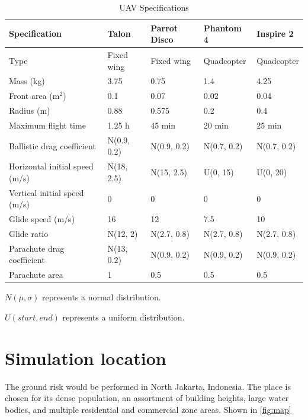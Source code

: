 \documentclass[12pt]{report}
\begin{document}
        \begin{table}[H]
            \centering
            \caption{UAV Specifications}  %
            \begin{tabular}{| l | l | l | l | l |}
                \hline
                \textbf{Specification} & \textbf{Talon} & \textbf{Parrot Disco} & \textbf{Phantom 4} & \textbf{Inspire 2} \\
                \hline
                Type & Fixed wing & Fixed wing & Quadcopter & Quadcopter \\
                Mass (kg) & 3.75 & 0.75 & 1.4 & 4.25 \\
                Front area (m$^2$) & 0.1 & 0.07 & 0.02 & 0.04 \\
                Radius (m) & 0.88 & 0.575 & 0.2 & 0.4 \\
                Maximum flight time & 1.25 h & 45 min & 20 min & 25 min \\
                Ballistic drag coefficient & N(0.9, 0.2) & N(0.9, 0.2) & N(0.7, 0.2) & N(0.7, 0.2) \\
                Horizontal initial speed (m/s) & N(18, 2.5) & N(15, 2.5) & U(0, 15) & U(0, 20) \\
                Vertical initial speed (m/s) & 0 & 0 & 0 & 0 \\
                Glide speed (m/s) & 16 & 12 & 7.5 & 10 \\
                Glide ratio & N(12, 2) & N(2.7, 0.8) & N(2.7, 0.8) & N(2.7, 0.8) \\
                Parachute drag coefficient & N(13, 0.2) & N(0.9, 0.2) & N(0.9, 0.2) & N(0.9, 0.2) \\
                Parachute area & 1 & 0.5 & 0.5 & 0.5 \\
                \hline
            \end{tabular}
            \begin{minipage}{\textwidth}
                \footnotesize
                \(N(\mu, \sigma)\) represents a normal distribution.

                \(U(start, end)\) represents a uniform distribution.
            \end{minipage}
        \end{table}

    \section{Simulation location}
        The ground risk would be performed in North Jakarta, Indonesia. The place is chosen for its dense population, an
        assortment of building heights, large water bodies, and multiple residential and commercial zone areas. Shown in \ref{fig:map}
\end{document}
